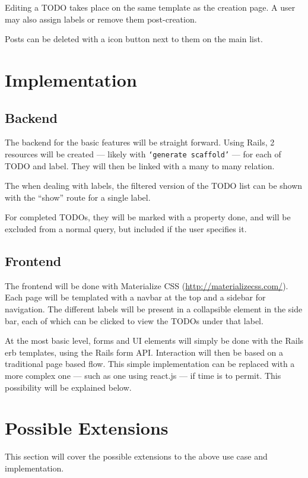\documentclass[12pt]{article}
\begin{document}
Editing a TODO takes place on the same template as the creation page. A user may also assign labels or remove them post-creation.

Posts can be deleted with a icon button next to them on the main list.

\section*{Implementation}

\subsection*{Backend}

The backend for the basic features will be straight forward. Using Rails, 2 resources will be created --- likely with \texttt{`generate scaffold'} --- for each of TODO and label. They will then be linked with a many to many relation.

The when dealing with labels, the filtered version of the TODO list can be shown with the ``show'' route for a single label.

For completed TODOs, they will be marked with a property done, and will be excluded from a normal query, but included if the user specifies it.

\subsection*{Frontend}

The frontend will be done with Materialize CSS (\url{http://materializecss.com/}). Each page will be templated with a navbar at the top and a sidebar for navigation. The different labels will be present in a collapsible element in the side bar, each of which can be clicked to view the TODOs under that label.

At the most basic level, forms and UI elements will simply be done with the Rails erb templates, using the Rails form API\@. Interaction will then be based on a traditional page based flow. This simple implementation can be replaced with a more complex one --- such as one using react.js --- if time is to permit. This possibility will be explained below.

\section*{Possible Extensions}

This section will cover the possible extensions to the above use case and implementation.
\end{document}
